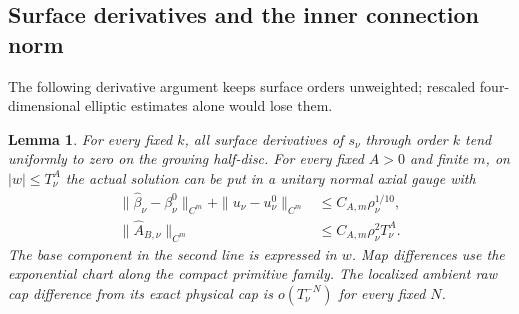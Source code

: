 \documentclass[11pt]{amsart}
\newtheorem{lemma}[theorem]{Lemma}
\theoremstyle{definition}
\theoremstyle{remark}
\theoremstyle{plain}
\begin{document}
\subsection{Surface derivatives and the inner connection norm}

The following derivative argument keeps surface orders unweighted;
rescaled four-dimensional elliptic estimates alone would lose them.

\begin{lemma}\label{lem:converse-surface-derivatives}
For every fixed $k$, all surface derivatives of $s_\nu$ through
order $k$ tend uniformly to zero on the growing half-disc.
For every fixed $A>0$ and finite $m$, on $|w|\leq T_\nu^A$
the actual solution can be put in a unitary normal axial gauge with
\begin{equation}\label{eq:converse-inner-jets}
\begin{split}
 \|\widehat\beta_\nu-\beta_\nu^0\|_{C^m}
       +\|u_\nu-u_\nu^0\|_{C^m}&\leq C_{A,m}\rho_\nu^{1/10},\\
 \|\widehat A_{B,\nu}\|_{C^m}&\leq C_{A,m}\rho_\nu^2T_\nu^A.
\end{split}
\end{equation}
The base component in the second line is expressed in $w$.
Map differences use the exponential chart along the compact primitive
family. The localized ambient raw cap difference from its exact
physical cap is $o(T_\nu^{-N})$ for every fixed $N$.
\end{lemma}
\end{document}
